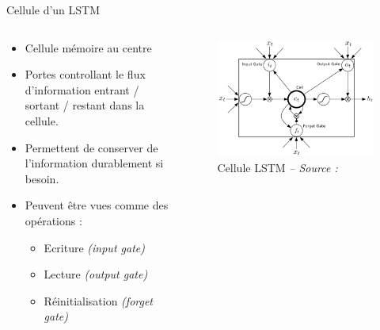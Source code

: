 \begin{frame}{Cellule d'un LSTM}
    
    \begin{columns}
        \begin{column}{.47\textwidth}
            \begin{itemize}
                \item Cellule mémoire au centre
                \item Portes controllant le flux d'information entrant / sortant / restant dans la cellule.
                \item Permettent de conserver de l'information durablement si besoin.
                \item Peuvent être vues comme des opérations :
                   \begin{itemize}
                        \item Ecriture \textit{(input gate)}
                        \item Lecture \textit{(output gate)}
                        \item Réinitialisation \textit{(forget gate)}
                    \end{itemize}
            \end{itemize}
            
            
        \end{column}
        \begin{column}{.55\textwidth}
            \begin{figure}
                \includegraphics[width=\textwidth]{images/lstm4}
                \caption{Cellule LSTM {\scriptsize\it -- Source : \cite{Graves13b}}}
            \end{figure}
        \end{column}
    \end{columns}
    
\end{frame}

